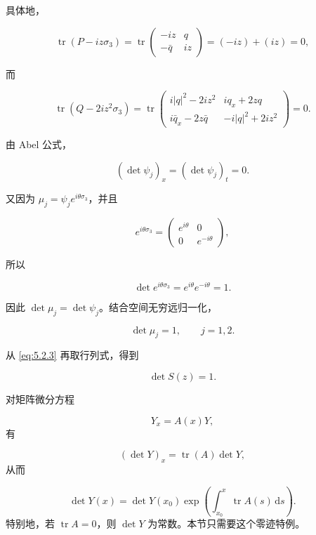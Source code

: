 \documentclass[
    lang=cn,
    scheme=chinese,
    mode=simple,
    device=normal,
    color=blue,
    math=cm,
    thmcnt=section,
    12pt,
    nowatermark
]{elegantbook}
\begin{document}
具体地，

\[
    \operatorname{tr}(P-iz\sigma_3)
    =
    \operatorname{tr}
    \begin{pmatrix}
        -iz & q \\
        -\bar q & iz
    \end{pmatrix}
    =
    (-iz)+(iz)
    =0,
\]

而

\[
    \operatorname{tr}(Q-2iz^2\sigma_3)
    =
    \operatorname{tr}
    \begin{pmatrix}
        i\lvert q\rvert^2-2iz^2 & iq_x+2zq \\
        i\bar q_x-2z\bar q & -i\lvert q\rvert^2+2iz^2
    \end{pmatrix}
    =0.
\]

由 Abel 公式，

\begin{equation}
    (\det\psi_j)_x
    =
    (\det\psi_j)_t
    =
    0.
    \tag{5.2.20}
    \label{eq:5.2.20}
\end{equation}

又因为 $\mu_j=\psi_je^{i\theta\sigma_3}$，并且

\[
    e^{i\theta\sigma_3}
    =
    \begin{pmatrix}
        e^{i\theta} & 0 \\
        0 & e^{-i\theta}
    \end{pmatrix},
\]

所以

\[
    \det e^{i\theta\sigma_3}
    =
    e^{i\theta}e^{-i\theta}
    =1.
\]

因此 $\det\mu_j=\det\psi_j$。结合空间无穷远归一化，

\begin{equation}
    \det\mu_j=1,\qquad j=1,2.
    \tag{5.2.21}
    \label{eq:5.2.21}
\end{equation}

从 \eqref{eq:5.2.3} 再取行列式，得到

\[
    \det S(z)=1.
\]

\begin{callout}
    对矩阵微分方程

    \[
        Y_x=A(x)Y,
    \]
    有

    \[
        (\det Y)_x=\operatorname{tr}(A)\det Y,
    \]
    从而

    \[
        \det Y(x)
        =
        \det Y(x_0)
        \exp\!\left(\int_{x_0}^{x}\operatorname{tr}A(s)\,\mathrm ds\right).
    \]
    特别地，若 $\operatorname{tr}A=0$，则 $\det Y$ 为常数。本节只需要这个零迹特例。
\end{callout}
\end{document}
